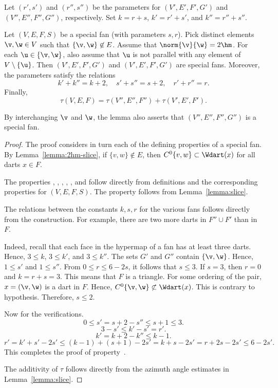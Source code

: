 Let $(r',s')$ and $(r'',s'')$ be the parameters for $(V',E',F',G')$
and $(V'',E'',F'',G'')$, respectively.  Set $k=r+s$, $k'=r'+s'$, and
$k''=r''+s''$.

\begin{lemma}\label{lemma:param-add}  
Let $(V,E,F,S)$ be a special fan (with parameters $s,r$).  Pick
distinct elements $\v,\w\in V$ such that $\{\v,\w\}\not\in E$.
Assume that $\norm{\v}{\w}=2\hm$.  For each $\u\in \{\v,\w\}$,
also assume that $\u$ is not parallel with any element of 
$V\setminus\{\u\}$.
Then $(V',E',F',G')$ and $(V',E',F',G')$ are special fans.  Moreover,
the parameters satisfy the relations
\[ 
k'+k'' = k + 2,\quad s'+s'' = s + 2,\quad r'+r''=r.
\] 
Finally,
\[ 
\tau(V,E,F)= \tau(V'',E'',F'') +\tau(V',E',F').
\] 
\end{lemma}

By interchanging $\v$ and $\w$, the lemma also asserts that
$(V'',E'',F'',G'')$ is a special fan.

\begin{proof} The proof considers in turn each of the defining properties of a
  special fan.  By Lemma~\ref{lemma:2hm-slice}, if
  $\{v,w\}\not\in E$, then $C^0\{v,w\}\subset \Wdart(x)$ for all darts
  $x\in F$.

The properties , , ,
, , and  follow directly from
definitions and the corresponding properties for $(V,E,F,S)$.  The
property  follows from Lemma~\ref{lemma:slice}.

The relations between the constants $k,s,r$ for the various fans
follows directly from the construction.  For example, there are two
more darts in $F''\cup F'$ than in $F$.

  Indeed, recall that each face
in the hypermap of a fan has at least three darts.  Hence, $3\le k$,
$3\le k'$, and $3\le k''$.  The sets $G'$ and $G''$ contain
$\{\v,\w\}$.  Hence, $1\le s'$ and $1\le s''$.  From $0\le r\le 6 -
2s$, it follows that $s\le 3$.  If $s=3$, then $r=0$ and $k=r+s=3$.
This means that $F$ is a triangle.  For some ordering of the pair,
$x=(\v,\w)$ is a dart in $F$.  Hence, $C^0\{\v,\w\} \not\subset
\Wdart(x)$.  This is contrary to hypothesis.  Therefore, $s\le 2$.

Now for the verifications.
\[ 0\le s' = s + 2 - s'' \le s+1\le 3.\] 
\[ 3-s'\le k'-s' = r'.\] 
\[ k' = k + 2 - k'' \le k-1.\] 
\[ 
  r'= k'+s' - 2 s' \le (k-1) + (s+1) - 2s' 
  =k+s - 2s' = r + 2s -2s' \le 6 - 2s'.
\] 
This completes the proof of property~.

The additivity of $\tau$ follows directly from the azimuth angle
estimates in Lemma~\ref{lemma:slice}.
\end{proof}


